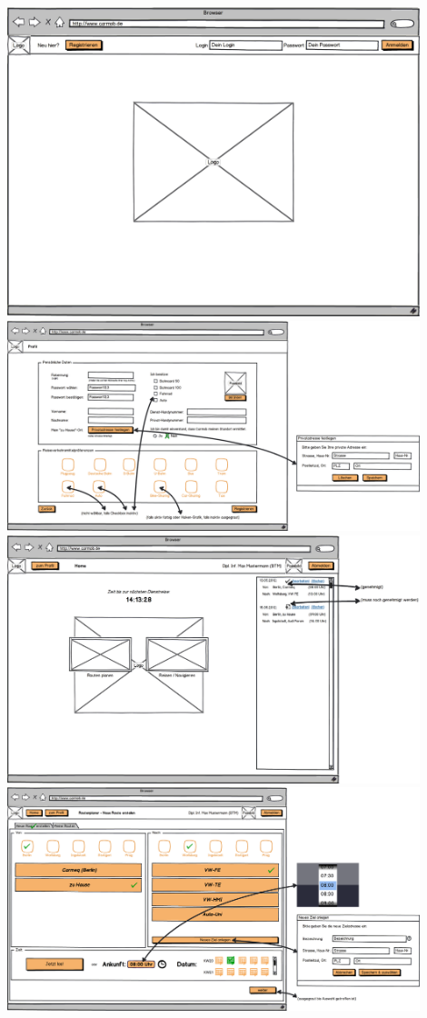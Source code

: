 \documentclass[12pt,a4paper]{article}
\begin{document}
\begin{center}
\includegraphics[width=12cm]{10_finaler_paperprototyp_001.png}\\
\includegraphics[width=12cm]{10_finaler_paperprototyp_002.png}\\
\includegraphics[width=12cm]{10_finaler_paperprototyp_003.png}\\
\includegraphics[width=12cm]{10_finaler_paperprototyp_004.png}\\

\end{center}
\end{document}
